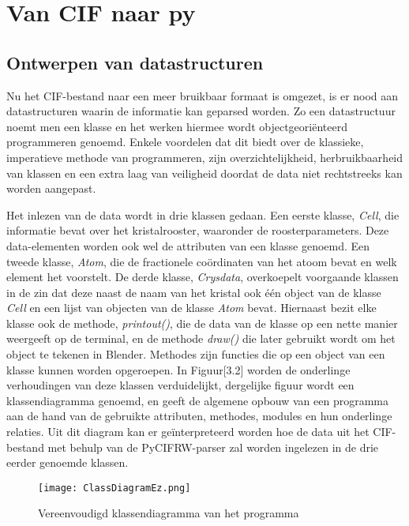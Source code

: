 \section{Van CIF naar py}

\subsection{Ontwerpen van datastructuren}
Nu het CIF-bestand naar een meer bruikbaar formaat is omgezet, is er nood aan datastructuren waarin de informatie kan geparsed worden. Zo een datastructuur noemt men een klasse en het werken hiermee wordt objectgeoriënteerd programmeren genoemd. Enkele voordelen dat dit biedt over de klassieke, imperatieve methode van programmeren, zijn overzichtelijkheid, herbruikbaarheid van klassen en een extra laag van veiligheid doordat de data niet rechtstreeks kan worden aangepast.
\par
Het inlezen van de data wordt in drie klassen gedaan. Een eerste klasse, \textit{Cell}, die informatie bevat over het kristalrooster, waaronder de roosterparameters. Deze data-elementen worden ook wel de attributen van een klasse genoemd. Een tweede klasse, \textit{Atom}, die de fractionele coördinaten van het atoom bevat en welk element het voorstelt. De derde klasse, \textit{Crysdata}, overkoepelt voorgaande klassen in de zin dat deze naast de naam van het kristal ook één object van de klasse \textit{Cell} en een lijst van objecten van de klasse \textit{Atom} bevat. Hiernaast bezit elke klasse ook de methode, \textit{printout()}, die de data van de klasse op een nette manier weergeeft op de terminal, en de methode \textit{draw()} die later gebruikt wordt om het object te tekenen in Blender. Methodes zijn functies die op een object van een klasse kunnen worden opgeroepen.  In Figuur[3.2] worden de onderlinge verhoudingen van deze klassen verduidelijkt, dergelijke figuur wordt een klassendiagramma genoemd, en geeft de algemene opbouw van een programma aan de hand van de gebruikte attributen, methodes, modules en hun onderlinge relaties. Uit dit diagram kan er geïnterpreteerd worden hoe de data uit het CIF-bestand met behulp van de PyCIFRW-parser zal worden ingelezen in de drie eerder genoemde klassen.

\begin{figure}[h]
\begin{center}
\texttt{[image: ClassDiagramEz.png]}
\end{center}
\caption{Vereenvoudigd klassendiagramma van het programma}
\end{figure}

